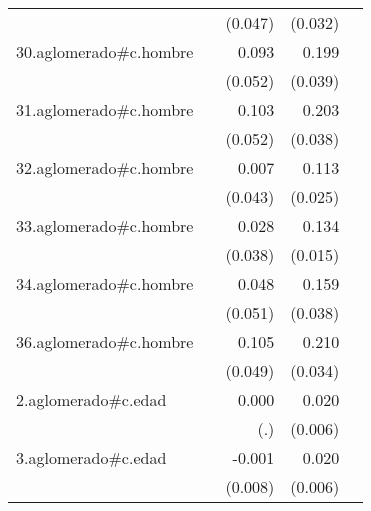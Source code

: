 {\begin{longtable}{l*{4}{D{.}{.}{-1}}}
            &                     &     (0.047)         &     (0.032)         &                     \\
\addlinespace
30.aglomerado#c.hombre&                     &       0.093         &       0.199\sym{***}&                     \\
            &                     &     (0.052)         &     (0.039)         &                     \\
\addlinespace
31.aglomerado#c.hombre&                     &       0.103\sym{*}  &       0.203\sym{***}&                     \\
            &                     &     (0.052)         &     (0.038)         &                     \\
\addlinespace
32.aglomerado#c.hombre&                     &       0.007         &       0.113\sym{***}&                     \\
            &                     &     (0.043)         &     (0.025)         &                     \\
\addlinespace
33.aglomerado#c.hombre&                     &       0.028         &       0.134\sym{***}&                     \\
            &                     &     (0.038)         &     (0.015)         &                     \\
\addlinespace
34.aglomerado#c.hombre&                     &       0.048         &       0.159\sym{***}&                     \\
            &                     &     (0.051)         &     (0.038)         &                     \\
\addlinespace
36.aglomerado#c.hombre&                     &       0.105\sym{*}  &       0.210\sym{***}&                     \\
            &                     &     (0.049)         &     (0.034)         &                     \\
\addlinespace
2.aglomerado#c.edad&                     &       0.000         &       0.020\sym{***}&                     \\
            &                     &         (.)         &     (0.006)         &                     \\
\addlinespace
3.aglomerado#c.edad&                     &      -0.001         &       0.020\sym{***}&                     \\
            &                     &     (0.008)         &     (0.006)         &                     \\

\end{longtable}}
